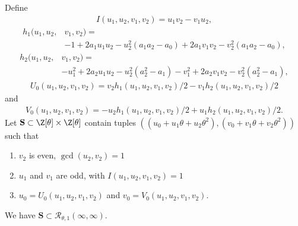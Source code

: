 \documentclass[12pt]{amsart}
\newcommand{\1}{\mathmybb{1}}
\begin{document}
Define
\begin{align*}
I(u_{1},u_{2},v_{1},v_{2}) = u_{1}v_{2}-v_{1}u_{2},
\end{align*}
\begin{align*}
h_{1}(u_{1},u_{2},& v_{1},v_{2}) = \\
&-1+2a_{1}u_{1}u_{2}-u_{2}^2(a_{1}a_{2}-a_{0})+2a_{1}v_{1}v_{2}-v_{2}^2(a_{1}a_{2}-a_{0}),
\end{align*}
\begin{align*}
h_{2}(u_{1},u_{2},& v_{1},v_{2}) = \\
& -u_{1}^2+2a_{2}u_{1}u_{2}-u_{2}^2(a_{2}^2-a_{1}) -v_{1}^2+2a_{2}v_{1}v_{2}-v_{2}^2(a_{2}^2-a_{1}),
\end{align*}
\begin{align*}
U_{0}(u_{1},u_{2},v_{1},v_{2}) = v_{2} h_{1}(u_{1},u_{2},v_{1},v_{2})/2 - v_{1} h_{2}(u_{1},u_{2},v_{1},v_{2})/2
\end{align*}
and
\begin{align*}
V_{0}(u_{1},u_{2},v_{1},v_{2}) = -u_{2} h_{1}(u_{1},u_{2},v_{1},v_{2})/2 +u_{1}h_{2}(u_{1},u_{2},v_{1},v_{2})/2.
\end{align*}
Let $\mathbf{S} \subset \Z[\theta]\times\Z[\theta]$ contain tuples $((u_{0}+u_{1}\theta+u_{2}\theta^2), (v_{0}+v_{1}\theta+v_{2}\theta^2))$ such that 
\begin{enumerate}
\item $v_{2}$ is even, $\gcd(u_{2},v_{2}) = 1$
\item $u_{1}$ and $v_{1}$ are odd, with $I(u_{1},u_{2},v_{1},v_{2}) = 1$
\item $u_{0} = U_{0}(u_{1},u_{2},v_{1},v_{2})$ and $v_{0} = V_{0}(u_{1},u_{2},v_{1},v_{2})$.
\end{enumerate}
\begin{lem}
\label{SsubsetRtheta1inftyinfty}
We have $\mathbf{S} \subset \mathcal{R}_{\theta,1}(\infty,\infty)$.
\end{lem}
\end{document}
